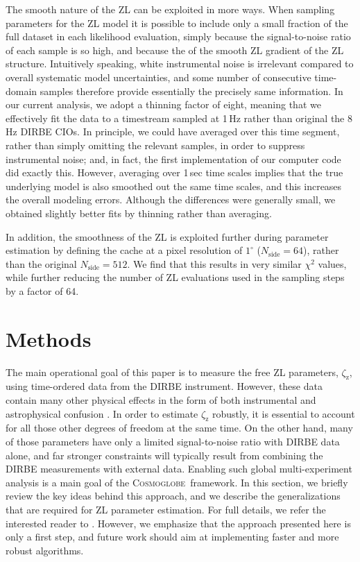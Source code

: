\documentclass[twocolumn]{aa}
\newcommand{\cosmoglobe}{\textsc{Cosmoglobe}}
\begin{document}
The smooth nature of the ZL can be exploited in more ways. When
sampling parameters for the ZL model it is possible to include only a
small fraction of the full dataset in each likelihood evaluation,
simply because the signal-to-noise ratio of each sample is so high,
and because the of the smooth ZL gradient of the ZL
structure. Intuitively speaking, white instrumental noise is
irrelevant compared to overall systematic model uncertainties, and
some number of consecutive time-domain samples therefore provide
essentially the precisely same information. In our current analysis,
we adopt a thinning factor of eight, meaning that we effectively fit
the data to a timestream sampled at 1\,Hz rather than original the
8\,Hz DIRBE CIOs. In principle, we could have averaged over this time
segment, rather than simply omitting the relevant samples, in order to
suppress instrumental noise; and, in fact, the first implementation of
our computer code did exactly this. However, averaging over 1\,sec
time scales implies that the true underlying model is also smoothed
out the same time scales, and this increases the overall modeling
errors. Although the differences were generally small, we obtained
slightly better fits by thinning rather than averaging.

In addition, the smoothness of the ZL is exploited further during
parameter estimation by defining the cache at a pixel resolution of
$1^{\circ}$ ($N_\mathrm{side} = 64$), rather than the original
$N_\mathrm{side} = 512$. We find that this results in very similar
$\chi^2$ values, while further reducing the number of ZL evaluations
used in the sampling steps by a factor of 64. 



\section{Methods}\label{sect:param-estimation}

The main operational goal of this paper is to measure the free ZL
parameters, $\zeta_{\mathrm{z}}$, using time-ordered data from the
DIRBE instrument. However, these data contain many other physical
effects in the form of both instrumental and astrophysical confusion
\citep[e.g.,][]{hauser1998,arendt1998}. In order to estimate
$\zeta_{\mathrm{z}}$ robustly, it is essential to account for all
those other degrees of freedom at the same time. On the other hand,
many of those parameters have only a limited signal-to-noise ratio
with DIRBE data alone, and far stronger constraints will typically
result from combining the DIRBE measurements with external
data. Enabling such global multi-experiment analysis is a main goal of
the \cosmoglobe\ framework. In this section, we briefly review the key
ideas behind this approach, and we describe the generalizations that
are required for ZL parameter estimation. For full details, we refer
the interested reader to \citet{Watts2023,CG02_01}. However, we
emphasize that the approach presented here is only a first step, and
future work should aim at implementing faster and more robust
algorithms.
\end{document}
